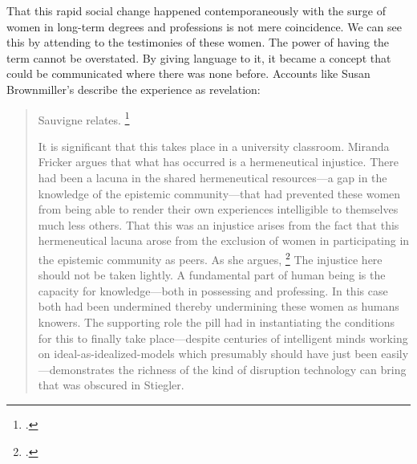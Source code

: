 \documentclass[letterpaper,notitlepage,12pt]{article}
\begin{document}
That this rapid social change happened contemporaneously with the surge of women
in long-term degrees and professions is not mere coincidence.
We can see this by attending to the testimonies of these women.
The power of having the term  cannot be overstated.
By giving language to it, it became a concept that could be communicated where
there was none before.
Accounts like Susan Brownmiller's describe the experience as revelation:
\blockquote{ Sauvigne relates.
  \footcite[p. 281]{brownmiller_our_1999}

It is significant that this takes place in a university classroom. Miranda
Fricker argues that what has occurred is a hermeneutical injustice.
There had been a lacuna in the shared hermeneutical resources---a gap in the
knowledge of the epistemic community---that had prevented these women from
being able to render their own experiences intelligible to themselves much less
others.
That this was an injustice arises from the fact that this hermeneutical lacuna
arose from the exclusion of women in participating in the epistemic community as
peers.
As she argues, \footcite[p. 132]{fricker_epistemic_2011}
The injustice here should not be taken lightly.
A fundamental part of human being is the capacity for knowledge---both in
possessing and professing.
In this case both had been undermined thereby undermining these women as humans
 knowers.
The supporting role the pill had in instantiating the conditions for this to
finally take place---despite centuries of intelligent minds working on
ideal-as-idealized-models which presumably should have just been easily
---demonstrates the richness of the kind of disruption
technology can bring that was obscured in Stiegler.

}
\end{document}
